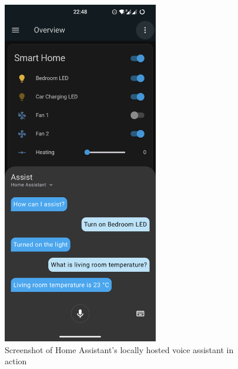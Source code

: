 \begin{figure}[!ht]
  \centering
  \includegraphics[width=68mm, keepaspectratio]{figures/homeassistant_android_assist.png}
  \caption{Screenshot of Home Assistant's locally hosted voice assistant in action}
  \label{fig:HAandroidVoiceAssistant}
\end{figure}
